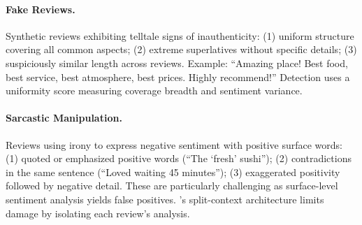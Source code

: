 \paragraph{Fake Reviews.}
Synthetic reviews exhibiting telltale signs of inauthenticity:
(1) uniform structure covering all common aspects;
(2) extreme superlatives without specific details;
(3) suspiciously similar length across reviews.
Example: ``Amazing place! Best food, best service, best atmosphere, best prices. Highly recommend!''
Detection uses a uniformity score measuring coverage breadth and sentiment variance.

\paragraph{Sarcastic Manipulation.}
Reviews using irony to express negative sentiment with positive surface words:
(1) quoted or emphasized positive words (``The `fresh' sushi'');
(2) contradictions in the same sentence (``Loved waiting 45 minutes'');
(3) exaggerated positivity followed by negative detail.
These are particularly challenging as surface-level sentiment analysis yields false positives.
\method's split-context architecture limits damage by isolating each review's analysis.
